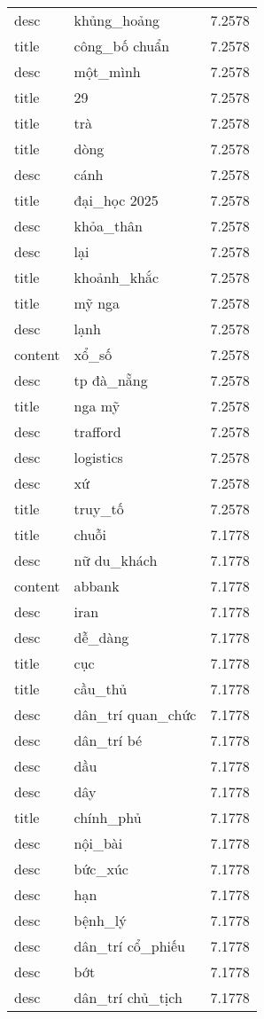 \documentclass{article}
\begin{document}
\begin{tabular}{lll}
desc & khủng\_hoảng & 7.2578\\
title & công\_bố chuẩn & 7.2578\\
desc & một\_mình & 7.2578\\
title & 29 & 7.2578\\
title & trà & 7.2578\\
title & dòng & 7.2578\\
desc & cánh & 7.2578\\
title & đại\_học 2025 & 7.2578\\
desc & khỏa\_thân & 7.2578\\
desc & lại & 7.2578\\
title & khoảnh\_khắc & 7.2578\\
title & mỹ nga & 7.2578\\
desc & lạnh & 7.2578\\
content & xổ\_số & 7.2578\\
desc & tp đà\_nẵng & 7.2578\\
title & nga mỹ & 7.2578\\
desc & trafford & 7.2578\\
desc & logistics & 7.2578\\
desc & xứ & 7.2578\\
title & truy\_tố & 7.2578\\
title & chuỗi & 7.1778\\
desc & nữ du\_khách & 7.1778\\
content & abbank & 7.1778\\
desc & iran & 7.1778\\
desc & dễ\_dàng & 7.1778\\
title & cục & 7.1778\\
title & cầu\_thủ & 7.1778\\
desc & dân\_trí quan\_chức & 7.1778\\
desc & dân\_trí bé & 7.1778\\
desc & dầu & 7.1778\\
desc & dây & 7.1778\\
title & chính\_phủ & 7.1778\\
desc & nội\_bài & 7.1778\\
desc & bức\_xúc & 7.1778\\
desc & hạn & 7.1778\\
desc & bệnh\_lý & 7.1778\\
desc & dân\_trí cổ\_phiếu & 7.1778\\
desc & bớt & 7.1778\\
desc & dân\_trí chủ\_tịch & 7.1778\\

\end{tabular}
\end{document}
